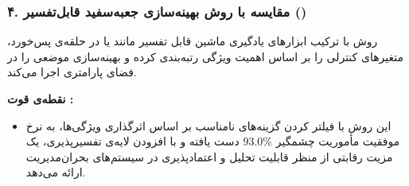 \documentclass[oneside,openany,a4paper,12pt]{article}
\begin{document}
\subsubsection{۴. مقایسه با روش بهینه‌سازی جعبه‌سفید قابل‌تفسیر  ()}

روش  با ترکیب ابزارهای یادگیری ماشین قابل تفسیر مانند  یا  در حلقه‌ی پس‌خورد، متغیرهای کنترلی را بر اساس اهمیت ویژگی رتبه‌بندی کرده و بهینه‌سازی موضعی را در فضای پارامتری اجرا می‌کند.

\textbf{نقطه‌ی قوت :}
\begin{itemize}
    \item این روش با فیلتر کردن گزینه‌های نامناسب بر اساس اثرگذاری ویژگی‌ها، به نرخ موفقیت مأموریت چشمگیر $93.0\%$ دست یافته و با افزودن لایه‌ی تفسیرپذیری، یک مزیت رقابتی از منظر قابلیت تحلیل و اعتمادپذیری در سیستم‌های بحران‌مدیریت ارائه می‌دهد.
\end{itemize}
\end{document}
